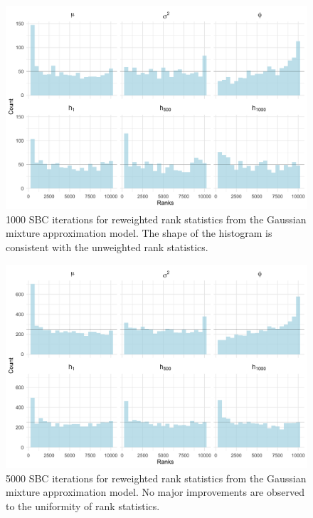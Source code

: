 \documentclass[12pt, a4paper]{article}
\begin{document}
    \begin{figure}[H]
        \centering
        \includegraphics[scale=0.1]{results/weighted_ksc_cp_1k.png}
        \caption{1000 SBC iterations for reweighted rank statistics from the Gaussian mixture approximation model. The shape of the histogram is consistent with the unweighted rank statistics.}
        \label{fig:reweight1k}
    \end{figure}

    \begin{figure}[H]
        \centering
        \includegraphics[scale=0.1]{results/weighted_ksc_cp_5k.png}
        \caption{5000 SBC iterations for reweighted rank statistics from the Gaussian mixture approximation model. No major improvements are observed to the uniformity of rank statistics.}
        \label{fig:reweight5k}
    \end{figure}
\end{document}
